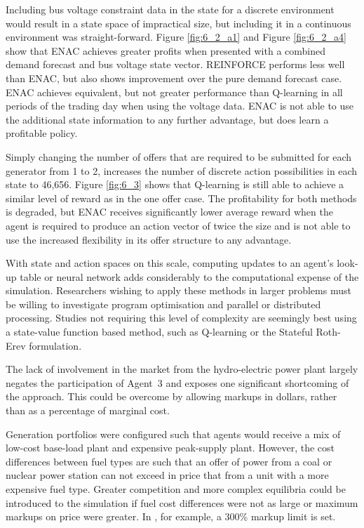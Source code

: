 Including bus voltage constraint data in the state for a discrete environment
would result in a state space of impractical size, but including it in a
continuous environment was straight-forward.  Figure \ref{fig:6_2_a1} and Figure
\ref{fig:6_2_a4} show that ENAC achieves greater profits when presented with a
combined demand forecast and bus voltage state vector.  REINFORCE performs less
well than ENAC, but also shows improvement over the pure demand forecast case.
ENAC achieves equivalent, but not greater performance than Q-learning in all
periods of the trading day when using the voltage data.  ENAC is not able to use
the additional state information to any further advantage, but does learn a
profitable policy.

Simply changing the number of offers that are required to be submitted for each
generator from 1 to 2, increases the number of discrete action possibilities in
each state to 46,656.  Figure \ref{fig:6_3} shows that Q-learning is still able
to achieve a similar level of reward as in the one offer case.  The
profitability for both methods is degraded, but ENAC receives significantly
lower average reward when the agent is required to produce an action
vector of twice the size and is not able to use the increased flexibility in
its offer structure to any advantage.

With state and action spaces on this scale, computing updates to an agent's
look-up table or neural network adds considerably to the computational expense
of the simulation.  Researchers wishing to apply these methods in larger
problems must be willing to investigate program optimisation and parallel or
distributed processing.  Studies not requiring this level of complexity are
seemingly best using a state-value function based method, such as Q-learning or
the Stateful Roth-Erev formulation.

The lack of involvement in the market from the hydro-electric power plant
largely negates the participation of Agent~3 and exposes one significant
shortcoming of the approach. This could be overcome by allowing markups
in dollars, rather than as a percentage of marginal cost.

Generation portfolios were configured such that agents would receive a mix of
low-cost base-load plant and expensive peak-supply plant.  However, the cost
differences between fuel types are such that an offer of power from a coal or
nuclear power station can not exceed in price that from a unit with a more
expensive fuel type.  Greater competition and more complex equilibria could be
introduced to the simulation if fuel cost differences were not as large or
maximum markups on price were greater.  In , for example, a
300\% markup limit is set.

